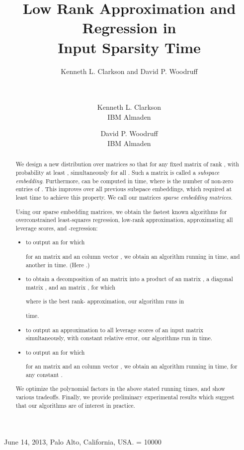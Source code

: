 \documentclass{sig-alternate}
\begin{document}
\ifSTOC
{} {June 14, 2013, Palo Alto, California, USA.}
\widowpenalty = 10000
\fi

\title{Low Rank Approximation and Regression in \\ Input Sparsity Time}
\ifSTOC
{} 
\author{\alignauthor Kenneth L. Clarkson and David P. Woodruff \\
 \\  \\
} 
\else \author{Kenneth L. Clarkson\\IBM Almaden \and David P. Woodruff\\IBM Almaden}
\fi
\maketitle
\begin{abstract}
We design a new distribution over  matrices  so that 
for any fixed  matrix  of rank , with probability at least , 
 simultaneously for all .
Such a matrix  is called a \emph{subspace embedding}.
Furthermore,  can be computed in 
time, where  is the number of non-zero entries of 
. 
This improves over all previous subspace embeddings, which required at least  time
to achieve this property. We call our matrices  \emph{sparse embedding matrices}. 

Using our sparse embedding matrices, we obtain the fastest known algorithms for 
overconstrained least-squares
regression, low-rank approximation, approximating all leverage scores, and -regression:
\begin{itemize}
\item to output an  for which 

for an 
matrix  and an  column vector , 
we obtain an algorithm running in  time,
and another in  time.
(Here .)
\item to obtain a decomposition of an  matrix  into a product of
an  matrix , a  diagonal matrix , and an  matrix ,
for which
 
where  is the best rank- approximation, our algorithm runs 
in

time.
\item to output an approximation to all leverage scores of an  
input matrix  simultaneously, with constant relative error,
our algorithms run in  time.
\item to output an  for which

for an 
matrix  and an  column vector , 
we obtain an algorithm running in  time, for any 
constant . 
\end{itemize}
We optimize the polynomial factors in the above stated running times, and show various tradeoffs. 
Finally, we provide preliminary experimental results which suggest that our algorithms are of interest in practice. 
\end{abstract}
\end{document}
